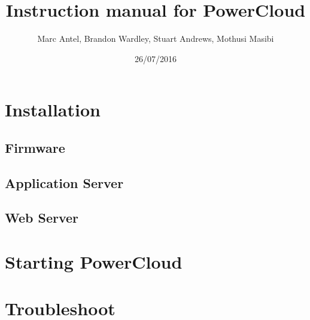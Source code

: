 \documentclass[a4paper,10pt]{article}
\title{Instruction manual for PowerCloud}
\author{Marc Antel, Brandon Wardley, Stuart Andrews, Mothusi Masibi}
\date{26/07/2016}
\begin{document}
\maketitle
\newpage
\section{Installation}
\subsection{Firmware}
\subsection{Application Server}
\subsection{Web Server}
\section{Starting PowerCloud}
\section{Troubleshoot}
\end{document}
